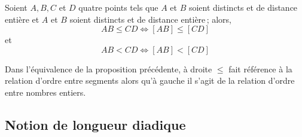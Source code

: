 \begin{prop}
    Soient $A,B,C$ et $D$ quatre points tels que $A$ et $B$ soient distincts et de distance entière et $A$ et $B$ soient distincts et de distance entière\,; alors,
    \begin{equation*}
        AB \leq CD \Longleftrightarrow [AB]\leq[CD]
    \end{equation*}
    et 
    \begin{equation*}
        AB <CD \Longleftrightarrow [AB]<[CD]
    \end{equation*}
\end{prop}
\begin{rema}
    Dans l'équivalence de la proposition précédente, à droite $\leq$ fait référence à la relation d'ordre entre segments alors qu'à gauche il s'agit de la relation d'ordre entre nombres entiers.  
\end{rema}

        \subsection{Notion de longueur diadique}

